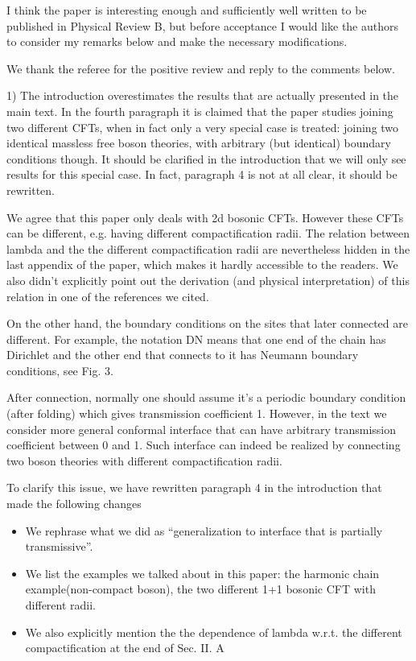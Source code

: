 \documentclass{article}
\newcommand{\reply}[1]{{\color{black}#1}}
\begin{document}
I think the paper is interesting enough and sufficiently well written to be published in Physical Review B, but before acceptance I would like the authors to consider my remarks below and make the necessary modifications.

\reply{We thank the referee for the positive review and reply to the comments below.}

1) The introduction overestimates the results that are actually presented in the main text. In the fourth paragraph it is claimed that the paper studies joining two different CFTs, when in fact only a very special case is treated: joining two identical massless free boson theories, with arbitrary (but identical) boundary conditions though. It should be clarified in the introduction that we will only see results for this special case. In fact, paragraph 4 is not at all clear, it should be rewritten.

\reply{We agree that this paper only deals with 2d bosonic CFTs. However these CFTs can be different, e.g. having different compactification radii. The relation between lambda and the the different compactification radii are nevertheless hidden in the last appendix of the paper, which makes it hardly accessible to the readers. We also didn't explicitly point out the derivation (and physical interpretation) of this relation in one of the references we cited. 

On the other hand, the boundary conditions on the sites that later connected are different. For example, the notation DN means that one end of the chain has Dirichlet and the other end that connects to it has Neumann boundary conditions, see Fig. 3.

After connection, normally one should assume it's a periodic boundary condition (after folding) which gives transmission coefficient 1. However, in the text we consider more general conformal interface that can have arbitrary transmission coefficient between 0 and 1. Such interface can indeed be realized by connecting two boson theories with different compactification radii.

To clarify this issue, we have rewritten paragraph 4 in the introduction that made the following changes 
\begin{itemize}
\item We rephrase what we did as ``generalization to interface that is partially transmissive''.
\item We list the examples we talked about in this paper: the harmonic chain example(non-compact boson), the two different 1+1 bosonic CFT with different radii.
\item We also explicitly mention the the dependence of lambda w.r.t. the different compactification at the end of Sec. II. A
\end{itemize}
}
\end{document}
